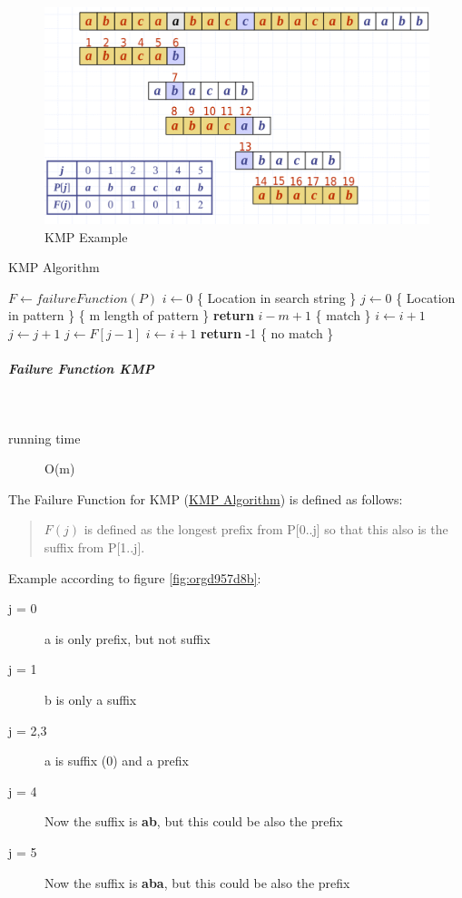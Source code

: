 \documentclass[11pt,twoside,twocolumn,landscape]{article}
\begin{document}
\begin{figure}[htbp]
\centering
\includegraphics[width=.9\linewidth]{img/kmp_example.png}
\caption{\label{fig:org755637f}KMP Example}
\end{figure}


\begin{algorithm}
  \caption{KMP Algorithm}
  \begin{algorithmic}[1]
    \State $F \leftarrow failureFunction(P)$
    \State $i \leftarrow 0$ \{ Location in search string \}
    \State $j \leftarrow 0$ \{ Location in pattern \}
     \{ m length of pattern \}
    \State \textbf{return} $i - m + 1$ \{ match \}
    \Else
    \State $i \leftarrow i + 1$
    \State $j \leftarrow j + 1$
    \EndIf
    \Else
    \State $j \leftarrow F[j-1]$
    \Else
    \State $i \leftarrow i + 1$
    \EndIf
    \EndIf
    \EndWhile
    \textbf{return} -1 \{ no match \}
    \EndProcedure
  \end{algorithmic}
\end{algorithm}

\subparagraph{Failure Function KMP} \
\label{sec:orge03d626}

\begin{description}
\item[{running time}] O(m)
\end{description}


The Failure Function for KMP (\href{../../../roam/20211215172001-kmp_algorithm.org}{KMP Algorithm}) is defined as follows:
\begin{quote}
\(F(j)\) is defined as the longest prefix from P[0..j] so that this also is the suffix from P[1..j].
\end{quote}

Example according to figure \ref{fig:orgd957d8b}:
\begin{description}
\item[{j = 0}] a is only prefix, but not suffix
\item[{j = 1}] b is only a suffix
\item[{j = 2,3}] a is suffix (0) and a prefix
\item[{j = 4}] Now the suffix is \textbf{ab}, but this could be also the prefix
\item[{j = 5}] Now the suffix is \textbf{aba}, but this could be also the prefix
\end{description}
\end{document}
